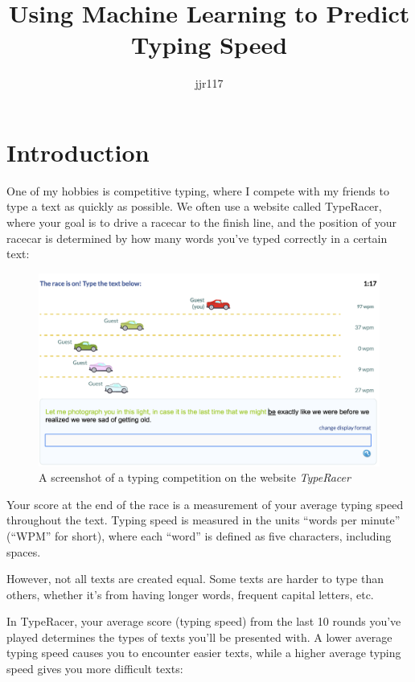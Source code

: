 \documentclass[12pt]{article}
\title{Using Machine Learning to Predict Typing Speed}
\author{jjr117}
\date{}
\begin{document}
\maketitle

\section*{Introduction}

One of my hobbies is competitive typing, where I compete with my friends to type a text as quickly as possible. We often use a website called TypeRacer, where your goal is to drive a racecar to the finish line, and the position of your racecar is determined by how many words you've typed correctly in a certain text:

\begin{figure}[H]
	\includegraphics[width=\textwidth]{typeracer.png}
	\caption{A screenshot of a typing competition on the website \textit{TypeRacer}}
\end{figure}

Your score at the end of the race is a measurement of your average typing speed throughout the text. Typing speed is measured in the units ``words per minute'' (``WPM'' for short), where each ``word'' is defined as five characters, including spaces.

However, not all texts are created equal. Some texts are harder to type than others, whether it's from having longer words, frequent capital letters, etc.

In TypeRacer, your average score (typing speed) from the last 10 rounds you've played determines the types of texts you'll be presented with. A lower average typing speed causes you to encounter easier texts, while a higher average typing speed gives you more difficult texts:
\end{document}
